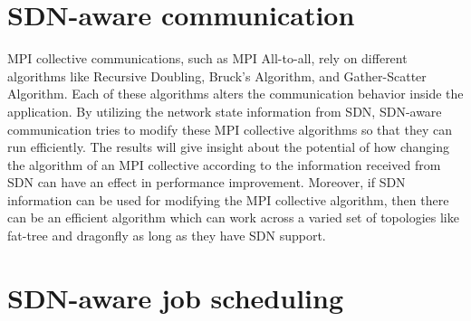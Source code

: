 \begin{comment}

Topology and routing schemes can significantly impact the effectiveness
of SDN for supporting HPC applications. 

I propose to study a number of
widely used interconnect configurations in the HPC environment: fat-tree
with deterministic routing, fat-tree with adaptive routing, and dragonfly.
SDN techniques will be developed and evaluated for
these configurations. 

The results will give insight about the potential of different 
network architectures in conjunction with SDN to optimize 
performance, scalability, and resource utilization in HPC environments. 
This understanding will not only inform network design decisions but 
also contribute to the development of tailored SDN solutions that 
effectively address the unique challenges posed by high-performance computing workloads.
\end{comment}

\section{SDN-aware communication}

MPI collective communications, such as MPI All-to-all, 
rely on different algorithms like Recursive Doubling, 
Bruck's Algorithm, and Gather-Scatter Algorithm. 
Each of these algorithms alters the communication behavior inside the application. 
By utilizing the network state information from SDN, SDN-aware communication 
tries to modify these MPI collective algorithms so that they can run efficiently. 
The results will give insight about the potential of how changing the algorithm 
of an MPI collective according to the information received from SDN can have an effect in 
performance improvement. Moreover, if SDN information can be used for modifying
the MPI collective algorithm, then there can be an efficient algorithm which can work
across a varied set of topologies like fat-tree and dragonfly as long as they have 
SDN support. 



\section{SDN-aware job scheduling}


